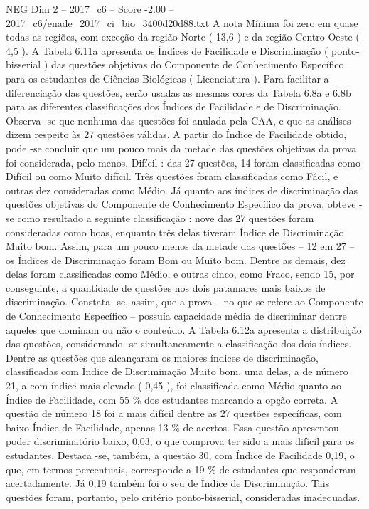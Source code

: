 \begin{textsample}{NEG Dim 2 – 2017\_c6 – Score -2.00 – 2017\_c6/enade\_2017\_ci\_bio\_3400d20d88.txt}
A nota Mínima foi zero em quase todas as regiões, com exceção da região Norte ( 13,6 ) e da região Centro-Oeste ( 4,5 ).
A Tabela 6.11a apresenta os Índices de Facilidade e Discriminação ( ponto-bisserial ) das questões objetivas do Componente de Conhecimento Específico para os estudantes de Ciências Biológicas ( Licenciatura ).
Para facilitar a diferenciação das questões, serão usadas as mesmas cores da Tabela 6.8a e 6.8b para as diferentes classificações dos Índices de Facilidade e de Discriminação.
Observa -se que nenhuma das questões foi anulada pela CAA, e que as análises dizem respeito às 27 questões válidas.
A partir do Índice de Facilidade obtido, pode -se concluir que um pouco mais da metade das questões objetivas da prova foi considerada, pelo menos, Difícil : das 27 questões, 14 foram classificadas como Difícil ou como Muito difícil.
Três questões foram classificadas como Fácil, e outras dez consideradas como Médio.
Já quanto aos índices de discriminação das questões objetivas do Componente de Conhecimento Específico da prova, obteve -se como resultado a seguinte classificação : nove das 27 questões foram consideradas como boas, enquanto três delas tiveram Índice de Discriminação Muito bom.
Assim, para um pouco menos da metade das questões – 12 em 27 – os Índices de Discriminação foram Bom ou Muito bom.
Dentre as demais, dez delas foram classificadas como Médio, e outras cinco, como Fraco, sendo 15, por conseguinte, a quantidade de questões nos dois patamares mais baixos de discriminação.
Constata -se, assim, que a prova – no que se refere ao Componente de Conhecimento Específico – possuía capacidade média de discriminar dentre aqueles que dominam ou não o conteúdo.
A Tabela 6.12a apresenta a distribuição das questões, considerando -se simultaneamente a classificação dos dois índices.
Dentre as questões que alcançaram os maiores índices de discriminação, classificadas com Índice de Discriminação Muito bom, uma delas, a de número 21, a com índice mais elevado ( 0,45 ), foi classificada como Médio quanto ao Índice de Facilidade, com 55 \% dos estudantes marcando a opção correta.
A questão de número 18 foi a mais difícil dentre as 27 questões específicas, com baixo Índice de Facilidade, apenas 13 \% de acertos.
Essa questão apresentou poder discriminatório baixo, 0,03, o que comprova ter sido a mais difícil para os estudantes.
Destaca -se, também, a questão 30, com Índice de Facilidade 0,19, o que, em termos percentuais, corresponde a 19 \% de estudantes que responderam acertadamente.
Já 0,19 também foi o seu de Índice de Discriminação.
Tais questões foram, portanto, pelo critério ponto-bisserial, consideradas inadequadas.

\end{textsample}
